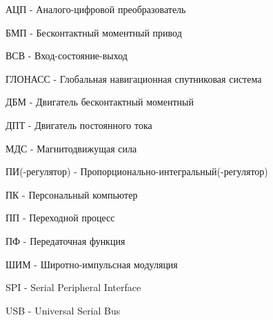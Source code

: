 \abb

\noindent
АЦП - Аналого-цифровой преобразователь

\noindent
БМП - Бесконтактный моментный привод

\noindent
ВСВ - Вход-состояние-выход

\noindent
ГЛОНАСС - Глобальная навигационная спутниковая система

\noindent
ДБМ - Двигатель бесконтактный моментный

\noindent
ДПТ - Двигатель постоянного тока

\noindent
МДС - Магнитодвижущая сила

\noindent
ПИ(-регулятор) - Пропорционально-интегральный(-регулятор)

\noindent
ПК - Персональный компьютер

\noindent
ПП - Переходной процесс

\noindent
ПФ - Передаточная функция

\noindent
ШИМ - Широтно-импульсная модуляция

\noindent
SPI - Serial Peripheral Interface

\noindent
USB - Universal Serial Bus